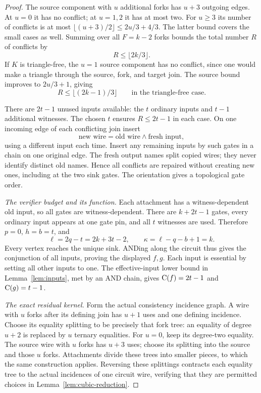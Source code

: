 \begin{proof}
The source component with $u$ additional forks has $u+3$ outgoing
edges. At $u=0$ it has no conflict; at $u=1,2$ it has at most two.
For $u\ge3$ its number of conflicts is at most
$\lfloor(u+3)/2\rfloor\le2u/3+4/3$.
The latter bound covers the small cases as well. Summing over all
$F=k-2$ forks bounds the total number $R$ of conflicts by
\[
 R\le\lfloor2k/3\rfloor.
\]
If $K$ is triangle-free, the $u=1$ source component has no conflict,
since one would make a triangle through the source, fork, and target
join. The source bound improves to $2u/3+1$, giving
\[
 R\le\lfloor(2k-1)/3\rfloor
 \qquad\text{in the triangle-free case}.
\]

There are $2t-1$ unused inputs available: the $t$ ordinary inputs and
$t-1$ additional witnesses. The chosen $t$ ensures $R\le2t-1$ in
each case. On one incoming edge of each conflicting join insert
\[
 \text{new wire}=\text{old wire}\land\text{fresh input},
\]
using a different input each time. Insert any remaining inputs by
such gates in a chain on one original edge. The fresh output names
split copied wires; they never identify distinct old names. Hence
all conflicts are repaired without creating new ones, including at
the two sink gates. The orientation gives a topological gate order.

\emph{The verifier budget and its function.}
Each attachment has a witness-dependent old input, so all gates are
witness-dependent. There are $k+2t-1$ gates, every ordinary input
appears at one gate pin, and all $t$ witnesses are used. Therefore
$p=0$, $h=b=t$, and
\[
 \ell=2q-t=2k+3t-2,\qquad
 \kappa=\ell-q-b+1=k.
\]
Every vertex reaches the unique sink. ANDing along the circuit thus
gives the conjunction of all inputs, proving the displayed $f,g$.
Each input is essential by setting all other inputs to one. The
effective-input lower bound in Lemma~\ref{lem:inputs},
met by an AND chain, gives $\mathrm{C}(f)=2t-1$ and $\mathrm{C}(g)=t-1$.

\emph{The exact residual kernel.}
Form the actual consistency incidence graph. A wire with $u$ forks
after its defining join has $u+1$ uses and one defining incidence.
Choose its equality splitting to be precisely that fork tree: an
equality of degree $u+2$ is replaced by $u$ ternary equalities.
For $u=0$, keep its degree-two equality. The source wire with $u$
forks has $u+3$ uses; choose its splitting into the source and those
$u$ forks. Attachments divide these trees into smaller pieces, to
which the same construction applies. Reversing these splittings
contracts each equality tree to the actual incidences of one circuit
wire, verifying that they are permitted choices in
Lemma~\ref{lem:cubic-reduction}.


\end{proof}

